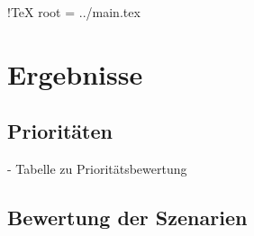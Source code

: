  !TeX root = ../main.tex

\chapter{Ergebnisse}\label{chapter:results}

	\section{Prioritäten}
	
		- Tabelle zu Prioritätsbewertung
	
	\section{Bewertung der Szenarien}